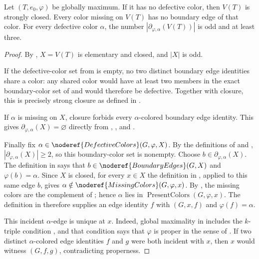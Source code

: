 \begin{lemma}
Let $(T,e_0,\varphi)$ be globally maximum.  If it has no defective color,
then $V(T)$ is strongly closed.  Every color missing on $V(T)$ has no
boundary edge of that color.  For every defective color $\alpha$, the
number $|\partial_{\varphi,\alpha}(V(T))|$ is odd and at least three.
\end{lemma}
\begin{proof}
By , $X=V(T)$ is elementary and closed,
and $|X|$ is odd.

If the defective-color set from  is empty, no two
distinct boundary edge identities share a color: any shared color would
have at least two members in the exact boundary-color set of
 and would therefore be defective.  Together
with closure, this is precisely strong closure as defined in
.

If $\alpha$ is missing on $X$, closure forbids every $\alpha$-colored
boundary edge identity.  This gives
$\partial_{\varphi,\alpha}(X)=\varnothing$ directly from
, , and
.

Finally fix $\alpha\in\noderef{DefectiveColors}(G,\varphi,X)$.  By the
definitions of  and ,
$|\partial_{\varphi,\alpha}(X)|\geq2$, so this boundary-color set is
nonempty.  Choose $b\in\partial_{\varphi,\alpha}(X)$.  The definition in
 says that $b\in\noderef{BoundaryEdges}(G,X)$
and $\varphi(b)=\alpha$.  Since $X$ is closed, for every $x\in X$ the
definition in , applied to this same edge
$b$, gives $\alpha\notin\noderef{MissingColors}(G,\varphi,x)$.  By
, the missing colors are the complement of
; hence $\alpha$ lies in
$\operatorname{PresentColors}(G,\varphi,x)$.  The definition in
 therefore supplies an edge identity $f$ with
$(G,x,f)$ and $\varphi(f)=\alpha$.

This incident $\alpha$-edge is unique at $x$.  Indeed, global maximality in
 includes the $k$-triple condition
, and that condition says that $\varphi$ is proper in the
sense of .  If two distinct $\alpha$-colored
edge identities $f$ and $g$ were both incident with $x$, then $x$ would
witness $(G,f,g)$, contradicting properness.


\end{proof}

